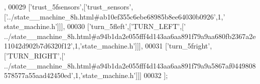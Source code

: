 \begin{DoxyCode}
      ,
00029   [\textcolor{stringliteral}{'trust\_5fsensors'},[\textcolor{stringliteral}{'trust\_sensors'},[\textcolor{stringliteral}{'../state\_\_machine\_8h.html#ab10ef355c6ebe68985b8ee64030b0926'},1,\textcolor{stringliteral}{'
      state\_machine.h'}]]],
00030   [\textcolor{stringliteral}{'turn\_5fleft'},[\textcolor{stringliteral}{'TURN\_LEFT'},[\textcolor{stringliteral}{'
      ../state\_\_machine\_8h.html#a94b1da2e055fff4d143aa6aa891f79a9aa680fb2367a2e11042d902b7d6320f12'},1,\textcolor{stringliteral}{'state\_machine.h'}]]],
00031   [\textcolor{stringliteral}{'turn\_5fright'},[\textcolor{stringliteral}{'TURN\_RIGHT'},[\textcolor{stringliteral}{'
      ../state\_\_machine\_8h.html#a94b1da2e055fff4d143aa6aa891f79a9a5867af0449808578577a55aad42450ed'},1,\textcolor{stringliteral}{'state\_machine.h'}]]]
00032 ];
\end{DoxyCode}
